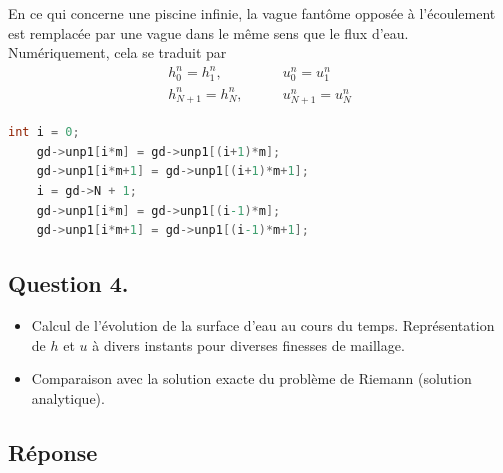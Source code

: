 \documentclass[
	french,
	11pt, %
]{fphw}
\begin{document}
En ce qui concerne une piscine infinie, la vague fantôme opposée à l'écoulement est remplacée par une vague dans le même sens que le flux d'eau. Numériquement, cela se traduit par
\begin{align*}
	h_0^n = h_1^n, &\qquad u_0^n = u_1^n \\
	h_{N+1}^n = h_N^n, &\qquad u_{N+1}^n = u_N^n
\end{align*}
\begin{lstlisting}[language=C, caption={Implementation des conditions aux limites pour un bassin infini.},breaklines]
	int i = 0;
	gd->unp1[i*m] = gd->unp1[(i+1)*m];
	gd->unp1[i*m+1] = gd->unp1[(i+1)*m+1];
	i = gd->N + 1;
	gd->unp1[i*m] = gd->unp1[(i-1)*m];
	gd->unp1[i*m+1] = gd->unp1[(i-1)*m+1];
\end{lstlisting}


\subsection*{Question 4.}
\begin{problem}
	\begin{itemize}
		\item Calcul de l'évolution de la surface d'eau au cours du temps. Représentation de $h$ et $u$ à divers instants pour diverses finesses de maillage.
		\item Comparaison avec la solution exacte du problème de Riemann (solution analytique).
	\end{itemize}
	 
\end{problem}

\subsection*{Réponse} 
\end{document}
